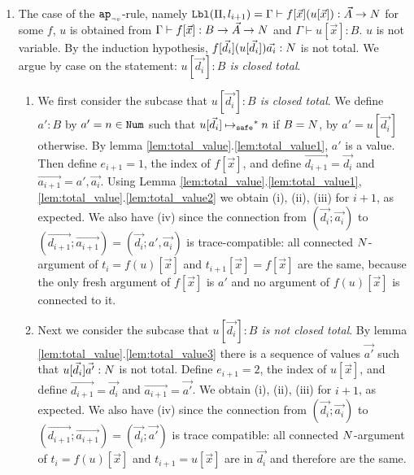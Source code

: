 \documentclass{article}
\newenvironment{proof}[1][Proof]{\begin{trivlist}
\item[\hskip \labelsep {\bfseries #1}]}{\end{trivlist}}
\begin{document}
\begin{proof}
\begin{enumerate}
\item
  The case of the ${{\tt ap}_{\mbox{\tiny $\neg v$}}}$-rule, namely 
  ${\tt Lbl}(\Pi,l_{i+1}) = \Gamma\vdash f[\vec{x}](u[\vec{x}]): \vec{A}\rightarrow{N}$ 
  for some $f$, $u$
  is obtained from $\Gamma\vdash f[\vec{x}]: B \rightarrow \vec{A}\rightarrow{N}$ 
  and $\Gamma\vdash u[\vec{x}]: B$. $u$ is not variable.
  By the induction hypothesis, $f[\vec{d_i}](u[\vec{d_i}])\vec{a_i}:{N}$ is not total.
  We argue by case on the statement: \emph{$u[\vec{d_i}]:B$ is closed total}.

\begin{enumerate}
\item
  We first consider the subcase that \emph{$u[\vec{d_i}]:B$ is closed total}.
  We define $a':B$ by $a' = n\in{\tt Num}$ such that $u[\vec{d_i}] \mathbin{{\mapsto}_{\tiny \tt safe}}^* n$ if $B={N}$,
  by $a' = u[\vec{d_i}]$ otherwise. By lemma \ref{lem:total_value}.\ref{lem:total_value1}, $a'$ is a value.
  Then define $e_{i+1}=1$, the index of $f[\vec{x}]$,
  and define $\vec{d_{i+1}} = \vec{d_i}$ and $\vec{a_{i+1}} = a',\vec{a_i}$. 
  Using Lemma \ref{lem:total_value}.\ref{lem:total_value1}, \ref{lem:total_value}.\ref{lem:total_value2}
  we obtain (i), (ii), (iii) for $i+1$, as expected. 
  We also have (iv) since the connection from 
  $(\vec{d_i};\vec{a_i})$ to $(\vec{d_{i+1}};\vec{a_{i+1}}) = (\vec{d_i};a',\vec{a_i})$ is
  trace-compatible: all connected 
  ${N}$-argument of $t_{i}=f(u)[\vec{x}]$ and $t_{i+1}[\vec{x}] = f[\vec{x}]$ are the same,
  because the only fresh argument of $f[\vec{x}]$ 
  is $a'$ and no argument of $f(u)[\vec{x}]$ is connected to it.
\item
  Next we consider the subcase that \emph{$u[\vec{d_i}]:B$ is not closed total}.
  By lemma \ref{lem:total_value}.\ref{lem:total_value3}
  there is a sequence of values $\vec{a'}$ such that $u[\vec{d_i}]\vec{a'}:{N}$ is not total.
  Define $e_{i+1}=2$, the index of $u[\vec{x}]$,
  and define $\vec{d_{i+1}} = \vec{d_i}$ and $\vec{a_{i+1}} = \vec{a'}$. 
  We obtain (i), (ii), (iii) for $i+1$, as expected.
  We also have (iv) since the connection from 
  $(\vec{d_i};\vec{a_i})$ to $(\vec{d_{i+1}};\vec{a_{i+1}}) = (\vec{d_i};\vec{a'})$ is
  trace compatible: all connected ${N}$-argument of $t_{i}=f(u)[\vec{x}]$ and $t_{i+1}=u[\vec{x}]$ are 
  in $\vec{d_i}$ and therefore are the same.
 \end{enumerate}


\end{enumerate}
\end{proof}
\end{document}
